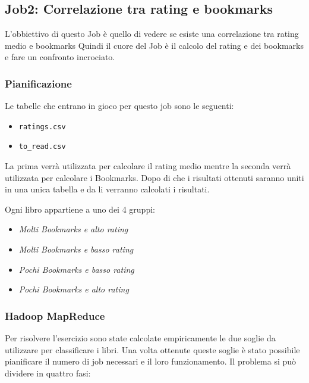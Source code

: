 \subsection{Job2: Correlazione tra rating e bookmarks}

L'obbiettivo di questo Job è quello di vedere se esiste una correlazione tra rating medio e bookmarks
Quindi il cuore del Job è il calcolo del rating e dei bookmarks e fare un confronto incrociato.

\subsubsection{Pianificazione}
Le tabelle che entrano in gioco per questo job sono le seguenti:
\begin{itemize}
    \item \texttt{ratings.csv}
    \item \texttt{to\_read.csv}
\end{itemize}

La prima verrà utilizzata per calcolare il rating medio mentre la seconda verrà utilizzata per calcolare i Bookmarks.
Dopo di che i risultati ottenuti saranno uniti in una unica tabella e da li verranno calcolati i risultati.

Ogni libro appartiene a uno dei 4 gruppi:
\begin{itemize}
    \item \textit{Molti Bookmarks e alto rating}
    \item \textit{Molti Bookmarks e basso rating}
    \item \textit{Pochi Bookmarks e basso rating}
    \item \textit{Pochi Bookmarks e alto rating}
\end{itemize}

\subsubsection{Hadoop MapReduce}

Per risolvere l'esercizio sono state calcolate empiricamente le due soglie da utilizzare per classificare i libri.
Una volta ottenute queste soglie è stato possibile pianificare il numero di job necessari e il loro funzionamento.
Il problema si può dividere in quattro fasi:


